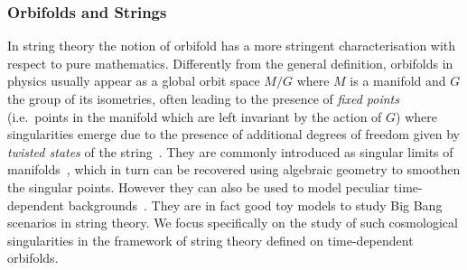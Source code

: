\subsubsection{Orbifolds and Strings}

In string theory the notion of orbifold has a more stringent characterisation with respect to pure mathematics.
Differently from the general definition, orbifolds in physics usually appear as a global orbit space $M / G$ where $M$ is a manifold and $G$ the group of its isometries, often leading to the presence of \emph{fixed points} (i.e.\ points in the manifold which are left invariant by the action of $G$) where singularities emerge due to the presence of additional degrees of freedom given by \emph{twisted states} of the string~\cite{Dixon:1985:StringsOrbifolds,Dixon:1986:StringsOrbifoldsII}.
They are commonly introduced as singular limits of \cy manifolds~\cite{Candelas:1985:VacuumConfigurationsSuperstrings}, which in turn can be recovered using algebraic geometry to smoothen the singular points.
However they can also be used to model peculiar time-dependent backgrounds~\cite{Horowitz:1991:SingularStringSolutions,Figueroa-OFarrill:2001:GeneralisedSupersymmetricFluxbranes,Cornalba:2002:NewCosmologicalScenario,Cornalba:2004:TimedependentOrbifoldsString,Craps:2006:BigBangModels,Bachas:2002:NullBraneIntersections,Bachas:2003:RelativisticStringPulse}.
They are in fact good toy models to study Big Bang scenarios in string theory.
We focus specifically on the study of such cosmological singularities in the framework of string theory defined on time-dependent orbifolds.

